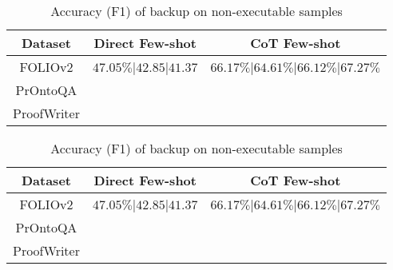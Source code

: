 \documentclass[conference]{IEEEtran}
\begin{document}
\begin{table*}[t]
    \centering
    \begin{tabular}{|c|c|c|}
    \hline
    \textbf{Dataset}                    &       \textbf{Direct Few-shot}         & \textbf{CoT Few-shot}                                  \\ \hline
    FOLIOv2                             &  $47.05\%$|$42.85$|$41.37$    &  $66.17\%$|$64.61\%$|$66.12\%$|$67.27\%$      \\ \hline
    PrOntoQA                            &                               &                                               \\ \hline
    ProofWriter                         &                               &                                               \\ \hline
    \end{tabular}
\caption{Accuracy (F1) of backup on non-executable samples}    
\end{table*}

\begin{table*}[t]
    \centering
    \begin{tabular}{|c|c|c|}
    \hline
    \textbf{Dataset}                    &       \textbf{Direct Few-shot}         & \textbf{CoT Few-shot}                                  \\ \hline
    FOLIOv2                             &  $47.05\%$|$42.85$|$41.37$    &  $66.17\%$|$64.61\%$|$66.12\%$|$67.27\%$      \\ \hline
    PrOntoQA                            &                               &                                               \\ \hline
    ProofWriter                         &                               &                                               \\ \hline
    \end{tabular}
\caption{Accuracy (F1) of backup on non-executable samples}    
\end{table*}
\end{document}
